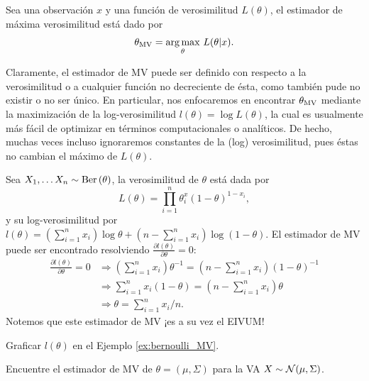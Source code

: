 \begin{definition}
	Sea una observación $x$ y una función de verosimilitud $L(\theta)$, el estimador de máxima verosimilitud está dado por 
	\begin{equation}
		\thetaMV = \underset{\theta}{\arg\max}\ L(\theta|x).
	\end{equation}	
\end{definition}

Claramente, el estimador de MV puede ser definido con respecto a la verosimilitud o a cualquier función no decreciente de ésta, como también pude no existir o no ser único. En particular, nos enfocaremos en encontrar ${\theta_\text{MV}}$ mediante la maximización de la log-verosimilitud $l(\theta) = \log L(\theta)$, la cual es usualmente más fácil de optimizar en términos computacionales o analíticos. De hecho, muchas veces incluso ignoraremos constantes de la (log) verosimilitud, pues éstas no cambian el máximo de $L(\theta)$.

\begin{example}
	\label{ex:bernoulli_MV}
	Sea $X_1,\ldots X_n\sim\text{Ber}\left(\theta\right)$, la verosimilitud de $\theta$ está dada por 
	\begin{equation}
		L(\theta) = \prod_{i=1}^n\theta^x_i(1-\theta)^{1-x_i},
	\end{equation}
	y su log-verosimilitud por $l(\theta) = (\sum_{i=1}^nx_i)\log \theta + (n-\sum_{i=1}^nx_i)\log(1-\theta)$. El estimador de  MV puede ser encontrado resolviendo $\frac{\partial l(\theta)}{\partial \theta} = 0$:
	\begin{align*}
	\frac{\partial l(\theta)}{\partial \theta} =0 
	&\Rightarrow  (\sum_{i=1}^nx_i) \theta^{-1} = (n-\sum_{i=1}^nx_i)(1-\theta)^{-1}\\
	&\Rightarrow  \sum_{i=1}^nx_i (1-\theta) = (n-\sum_{i=1}^nx_i) \theta\\
	&\Rightarrow  \theta = \sum_{i=1}^nx_i/n.
	\end{align*}
Notemos que este estimador de MV ¡es a su vez el EIVUM!	
\end{example}


\begin{exercise}
	Graficar $l(\theta)$ en el Ejemplo \ref{ex:bernoulli_MV}.
\end{exercise}

\begin{exercise}
	Encuentre el estimador de MV de $\theta = (\mu,\Sigma)$ para la VA $X\sim{\mathcal N}(\mu,\Sigma)$.
\end{exercise}

